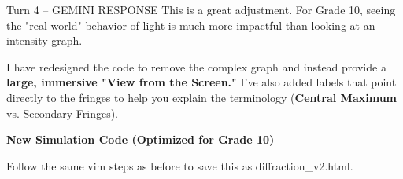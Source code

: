 \documentclass[10pt,a4paper]{article}
\begin{document}
\begin{aibox}{Turn 4 -- GEMINI RESPONSE}
This is a great adjustment. For Grade 10, seeing the "real-world" behavior of light is much more impactful than looking at an intensity graph.

I have redesigned the code to remove the complex graph and instead provide a \textbf{large, immersive "View from the Screen."} I’ve also added labels that point directly to the fringes to help you explain the terminology (\textbf{Central Maximum} vs. Secondary Fringes).

\textbf{\large New Simulation Code (Optimized for Grade 10)}

Follow the same vim steps as before to save this as diffraction\_v2.html.

\end{aibox}
\end{document}
